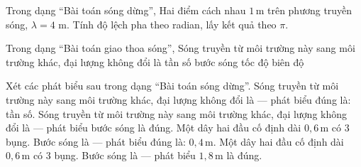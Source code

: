\begin{ex}
Trong dạng “Bài toán sóng dừng”, Hai điểm cách nhau $1\,\text{m}$ trên phương truyền sóng, $\lambda=4$ m. Tính độ lệch pha theo radian, lấy kết quả theo $\pi$.
\end{ex}

\begin{ex}
Trong dạng “Bài toán giao thoa sóng”, Sóng truyền từ môi trường này sang môi trường khác, đại lượng không đổi là
\choice
{\True tần số}
{bước sóng}
{tốc độ}
{biên độ}
\end{ex}

\begin{ex}
Xét các phát biểu sau trong dạng “Bài toán sóng dừng”.
\choiceTF
{\True Sóng truyền từ môi trường này sang môi trường khác, đại lượng không đổi là — phát biểu đúng là: tần số.}
{Sóng truyền từ môi trường này sang môi trường khác, đại lượng không đổi là — phát biểu bước sóng là đúng.}
{\True Một dây hai đầu cố định dài $0,6\,\text{m}$ có 3 bụng. Bước sóng là — phát biểu đúng là: $0,4\,\text{m}$.}
{Một dây hai đầu cố định dài $0,6\,\text{m}$ có 3 bụng. Bước sóng là — phát biểu $1,8\,\text{m}$ là đúng.}
\end{ex}

